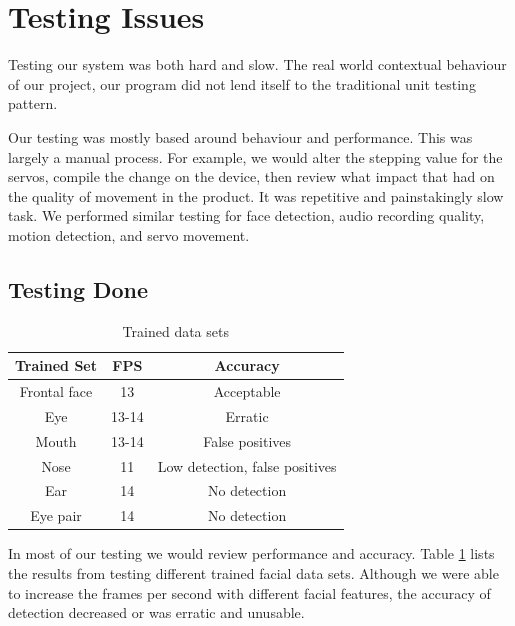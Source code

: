 \documentclass[11pt,a4paper,titlepage]{report}
\begin{document}
\section{Testing Issues}

Testing our system was both hard and slow. The real world contextual behaviour of our project, our program did not lend itself to the traditional unit testing pattern.

Our testing was mostly based around behaviour and performance. This was largely a manual process. For example, we would alter the stepping value for the servos, compile the change on the device, then review what impact that had on the quality of movement in the product. It was repetitive and painstakingly slow task. We performed similar testing for face detection, audio recording quality, motion detection, and servo movement.



\subsection{Testing Done}


\begin{table}
\begin{tabular}{|c|c|c|}
    \hline
    \textbf{Trained Set} & \textbf{FPS} & \textbf{Accuracy} \\ \hline
    
    Frontal face & 13 & Acceptable \\ \hline
    
    Eye & 13-14 & Erratic \\ \hline
    
    Mouth & 13-14 & False positives \\ \hline
    
    Nose & 11 & Low detection, false positives \\ \hline
    
    Ear & 14 & No detection \\ \hline
    
    Eye pair & 14 & No detection \\ \hline

\end{tabular}
\caption{Trained data sets}
\label{table:parts}
\end{table}

In most of our testing we would review performance and accuracy. Table \ref{table:parts} lists the results from testing different trained facial data sets. Although we were able to increase the frames per second with different facial features, the accuracy of detection decreased or was erratic and unusable.
\end{document}
